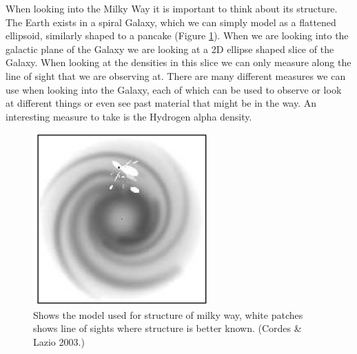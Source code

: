 \documentclass[a4paper, 10pt]{article}
\begin{document}
When looking into the Milky Way it is important to think about its structure. The Earth exists in a spiral Galaxy, which we can simply model as a flattened ellipsoid, similarly shaped to a pancake (Figure \ref{MWS}). When we are looking into the galactic plane of the Galaxy we are looking at a 2D ellipse shaped slice of the Galaxy. When looking at the densities in this slice we can only measure along the line of sight that we are observing at. There are many different measures we can use when looking into the Galaxy, each of which can be used to observe or look at different things or even see past material that might be in the way. An interesting measure to take is the Hydrogen alpha density.\\
\begin{figure}[H]
\begin{center}
	\includegraphics[width=0.6\textwidth]{MWS}
	\caption{Shows the model used for structure of milky way, white patches shows line of sights where structure is better known. (Cordes \& Lazio 2003.)}
	\label{MWS}
\end{center}
\end{figure}
\end{document}
